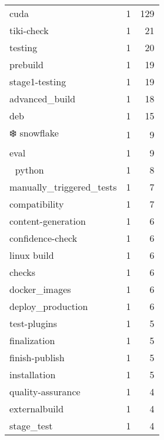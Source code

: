 \begin{tabular}{lrr}
cuda                       &                   1 &           129 \\
tiki-check                 &                   1 &            21 \\
testing                    &                   1 &            20 \\
prebuild                   &                   1 &            19 \\
stage1-testing             &                   1 &            19 \\
advanced\_build             &                   1 &            18 \\
deb                        &                   1 &            15 \\
❄️ snowflake               &                   1 &             9 \\
eval                       &                   1 &             9 \\
🐍 python                   &                   1 &             8 \\
manually\_triggered\_tests   &                   1 &             7 \\
compatibility              &                   1 &             7 \\
content-generation         &                   1 &             6 \\
confidence-check           &                   1 &             6 \\
linux build                &                   1 &             6 \\
checks                     &                   1 &             6 \\
docker\_images              &                   1 &             6 \\
deploy\_production          &                   1 &             6 \\
test-plugins               &                   1 &             5 \\
finalization               &                   1 &             5 \\
finish-publish             &                   1 &             5 \\
installation               &                   1 &             5 \\
quality-assurance          &                   1 &             4 \\
externalbuild              &                   1 &             4 \\
stage\_test                 &                   1 &             4 \\

\end{tabular}
